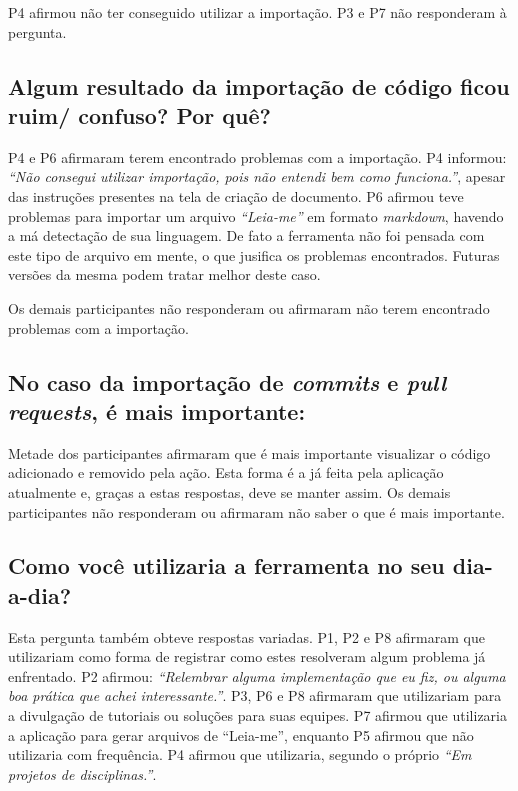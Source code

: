 P4 afirmou não ter conseguido utilizar a importação. P3 e P7 não responderam à pergunta.

\subsection{Algum resultado da importação de código ficou ruim/ confuso? Por quê?}

P4 e P6 afirmaram terem encontrado problemas com a importação. P4 informou: \textit{``Não consegui utilizar importação, pois não entendi bem como funciona.''}, apesar das instruções presentes na tela de criação de documento. P6 afirmou teve problemas para importar um arquivo \textit{``Leia-me''} em formato \textit{markdown}, havendo a má detectação de sua linguagem. De fato a ferramenta não foi pensada com este tipo de arquivo em mente, o que jusifica os problemas encontrados. Futuras versões da mesma podem tratar melhor deste caso.

Os demais participantes não responderam ou afirmaram não terem encontrado problemas com a importação.

\subsection{No caso da importação de \textit{commits} e \textit{pull requests}, é mais importante: }

Metade dos participantes afirmaram que é mais importante visualizar o código adicionado e removido pela ação. Esta forma é a já feita pela aplicação atualmente e, graças a estas respostas, deve se manter assim. Os demais participantes não responderam ou afirmaram não saber o que é mais importante.

\subsection{Como você utilizaria a ferramenta no seu dia-a-dia?}

Esta pergunta também obteve respostas variadas. P1, P2 e P8 afirmaram que utilizariam como forma de registrar como estes resolveram algum problema já enfrentado. P2 afirmou: \textit{``Relembrar alguma implementação que eu fiz, ou alguma boa prática que achei interessante.''}. P3, P6 e P8 afirmaram que utilizariam para a divulgação de tutoriais ou soluções para suas equipes. P7 afirmou que utilizaria a aplicação para gerar arquivos de ``Leia-me'', enquanto P5 afirmou que não utilizaria com frequência. P4 afirmou que utilizaria, segundo o próprio \textit{``Em projetos de disciplinas.''}.

